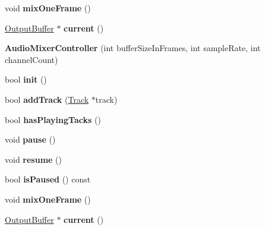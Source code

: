 \begin{DoxyCompactItemize}
void {\bfseries mix\+One\+Frame} ()
\item 
\mbox{\label{classcocos2d_1_1experimental_1_1AudioMixerController_ad73ca1d2158e731f4821501c61c74090}} 
\hyperlink{structcocos2d_1_1experimental_1_1AudioMixerController_1_1OutputBuffer}{Output\+Buffer} $\ast$ {\bfseries current} ()
\item 
\mbox{\label{classcocos2d_1_1experimental_1_1AudioMixerController_a32eb2831c1978e4dabaa633402f47d5b}} 
{\bfseries Audio\+Mixer\+Controller} (int buffer\+Size\+In\+Frames, int sample\+Rate, int channel\+Count)
\item 
\mbox{\label{classcocos2d_1_1experimental_1_1AudioMixerController_a28f8b1f80258369f22a281adb1bef076}} 
bool {\bfseries init} ()
\item 
\mbox{\label{classcocos2d_1_1experimental_1_1AudioMixerController_adec7fcd01db52af59fe6c8d02b0f615c}} 
bool {\bfseries add\+Track} (\hyperlink{classcocos2d_1_1experimental_1_1Track}{Track} $\ast$track)
\item 
\mbox{\label{classcocos2d_1_1experimental_1_1AudioMixerController_ac71e108a99a327ce66e105a106ad167c}} 
bool {\bfseries has\+Playing\+Tacks} ()
\item 
\mbox{\label{classcocos2d_1_1experimental_1_1AudioMixerController_ad5cbb74212f41d2d1c1fa291e7093fa6}} 
void {\bfseries pause} ()
\item 
\mbox{\label{classcocos2d_1_1experimental_1_1AudioMixerController_a9e908cb2c56dac7dcf0d541fcdcf931e}} 
void {\bfseries resume} ()
\item 
\mbox{\label{classcocos2d_1_1experimental_1_1AudioMixerController_ad4c27ec821a52f38f389ba9cf7fd75c7}} 
bool {\bfseries is\+Paused} () const
\item 
\mbox{\label{classcocos2d_1_1experimental_1_1AudioMixerController_ace9230c02ef344018bbc158355133bdb}} 
void {\bfseries mix\+One\+Frame} ()
\item 
\mbox{\label{classcocos2d_1_1experimental_1_1AudioMixerController_ad73ca1d2158e731f4821501c61c74090}} 
\hyperlink{structcocos2d_1_1experimental_1_1AudioMixerController_1_1OutputBuffer}{Output\+Buffer} $\ast$ {\bfseries current} ()
\end{DoxyCompactItemize}


